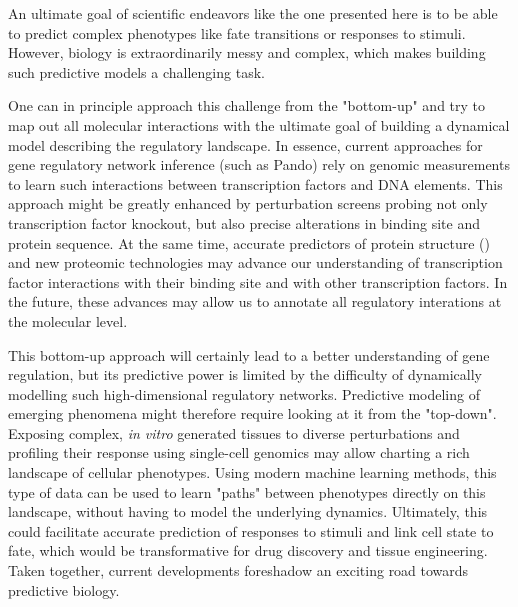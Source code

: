 An ultimate goal of scientific endeavors like the one presented here is to be able to predict complex phenotypes like fate transitions or responses to stimuli. However, biology is extraordinarily messy and complex, which makes building such predictive models a challenging task.

One can in principle approach this challenge from the "bottom-up" and try to map out all molecular interactions with the ultimate goal of building a dynamical model describing the regulatory landscape. In essence, current approaches for gene regulatory network inference (such as Pando) rely on genomic measurements to learn such interactions between transcription factors and DNA elements. This approach might be greatly enhanced by perturbation screens probing not only transcription factor knockout, but also precise alterations in binding site and protein sequence. At the same time, accurate predictors of protein structure (\cite{baek_accurate_2021,jumper_highly_2021}) and new proteomic technologies may advance our understanding of transcription factor interactions with their binding site and with other transcription factors. In the future, these advances may allow us to annotate all regulatory interations at the molecular level. 

This bottom-up approach will certainly lead to a better understanding of gene regulation, but its predictive power is limited by the difficulty of dynamically modelling such high-dimensional regulatory networks. Predictive modeling of emerging phenomena might therefore require looking at it from the "top-down". Exposing complex, \textit{in vitro} generated tissues to diverse perturbations and profiling their response using single-cell genomics may allow charting a rich landscape of cellular phenotypes. Using modern machine learning methods, this type of data can be used to learn "paths" between phenotypes directly on this landscape, without having to model the underlying dynamics. Ultimately, this could facilitate accurate prediction of responses to stimuli and link cell state to fate, which would be transformative for drug discovery and tissue engineering. Taken together, current developments foreshadow an exciting road towards predictive biology.


